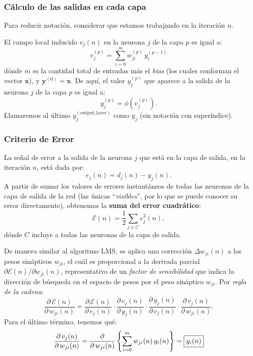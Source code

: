 \documentclass[10pt,a4paper]{article}
\begin{document}
\subsubsection{Cálculo de las salidas en cada capa}

\begin{multicols}{2}

Para reducir notación, considerar que estamos trabajando en la iteración $n$.

El campo local inducido $v_j(n)$ en la neurona $j$ de la capa $p$ es igual a:
\[v_j^{(p)}=\sum_{i=0}^m w_{ji}^{(p)} \, y_i^{(p-1)} \]
dónde $m$ es la cantidad total de entradas más el \textit{bias} (los cuales conforman el vector $\mathbf{x}$), y $\mathbf{y}^{(0)}=\mathbf{x}$. De aquí, el valor $y_j^{(p)}$ que aparece a la salida de la neurona $j$ de la capa $p$  es igual a:
\[y_j^{(p)}=\phi(v_j^{(p)}).\]
Llamaremos al último $y_j^{(\text{output\_layer})}$ como $y_j$ (sin notación con superíndice).

\end{multicols}

\subsubsection{Criterio de Error}

La señal de error a la salida de la neurona $j$ que está en la capa de salida, en la iteración $n$, está dada por:
\[e_j(n)=d_j(n)-y_j(n).\]
A partir de sumar los valores de errores instantáneos de todas las neuronas de la capa de salida de la red (las únicas ``\textit{visibles}'', por lo que se puede conocer su error directamente), obtenemos la \textbf{suma del error cuadrático}:
\[\mathcal{E}(n)=\frac{1}{2}\sum_{j\in C} e_j^2(n),\]
dónde $C$ incluye a todas las neuronas de la capa de salida.

De manera similar al algoritmo LMS, se aplica una corrección $\Delta w_{ji}(n)$ a los pesos sinápticos $w_{ji}$, el cuál es proporcional a la derivada parcial $\partial \mathcal{E} (n)/\partial w_{ji}(n)$, representativo de un \textit{factor de sensibilidad} que indica la dirección de búsqueda en el espacio de pesos por el peso sináptico $w_{ji}$. Por \textit{regla de la cadena}:
\[
\frac{\partial \, \mathcal{E} (n)}{\partial \, w_{ji}(n)} =
\frac{\partial \, \mathcal{E} (n)}{\partial \, e_j(n)} \cdot
\frac{\partial \, e_j (n)}{\partial \, y_j(n)} \cdot
\frac{\partial \, y_j (n)}{\partial \, v_j(n)} \cdot
\frac{\partial \, v_j (n)}{\partial \, w_{ji}(n)}.
\]
Para el último término, tenemos qué:
\[
\frac{\partial \, v_j (n)}{\partial \, w_{ji}(n)} =
\frac{\partial}{\partial \, w_{ji}(n)} \left\{ \sum_{i=0}^m w_{ji}(n) \, y_i(n) \right\} = \fbox{$y_i(n)$}
\]
\end{document}
